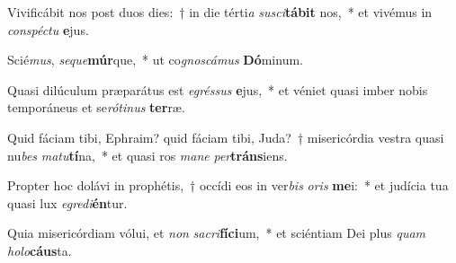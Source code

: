 \item Vivificábit nos post duos dies:~† in die térti\textit{a} \textit{su}\textit{sci}\textbf{tá}\textbf{bit} nos,~* et vivémus in \textit{con}\textit{spéc}\textit{tu} \textbf{e}jus.
\item Scié\textit{mus}, \textit{se}\textit{que}\textbf{múr}que,~* ut co\textit{gnos}\textit{cá}\textit{mus} \textbf{Dó}minum.
\item Quasi dilúculum præparátus est \textit{e}\textit{grés}\textit{sus} \textbf{e}jus,~* et véniet quasi imber nobis temporáneus et se\textit{ró}\textit{ti}\textit{nus} \textbf{ter}ræ.
\item Quid fáciam tibi, Ephraim? quid fáciam tibi, Juda?~† misericórdia vestra quasi nu\textit{bes} \textit{ma}\textit{tu}\textbf{tí}na,~* et quasi ros \textit{ma}\textit{ne} \textit{per}\textbf{tráns}iens.
\item Propter hoc dolávi in prophétis,~† occídi eos in ver\textit{bis} \textit{o}\textit{ris} \textbf{me}i:~* et judícia tua quasi lux \textit{e}\textit{gre}\textit{di}\textbf{én}tur.
\item Quia misericórdiam vólui, et \textit{non} \textit{sa}\textit{cri}\textbf{fí}\textbf{ci}um,~* et sciéntiam Dei plus \textit{quam} \textit{ho}\textit{lo}\textbf{cáus}ta.
